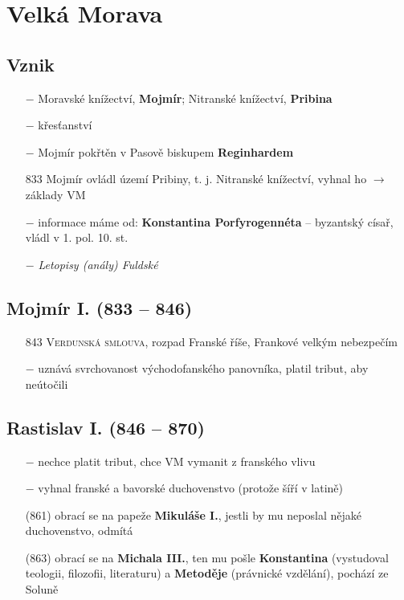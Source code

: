 \documentclass{article}
\begin{document}
\section*{Velká Morava}

\subsection*{Vznik}
\begin{itemize}
    \vspace{-0.5em}
    \setlength\itemsep{0.15em}
    \item[$-$] Moravské knížectví, \textbf{Mojmír}; Nitranské knížectví, \textbf{Pribina}
    \item[$-$] křesťanství
    \item[$-$] Mojmír pokřtěn v Pasově biskupem \textbf{Reginhardem}
    \item[833] Mojmír ovládl území Pribiny, t. j. Nitranské knížectví, vyhnal ho $\rightarrow$ základy VM
    \item[$-$] informace máme od: \textbf{Konstantina Porfyrogennéta} -- byzantský císař, vládl v 1. pol. 10. st.
    \item[$-$] \textit{Letopisy (anály) Fuldské}
\end{itemize}

\subsection*{Mojmír I. (833 -- 846)}
\begin{itemize}
    \vspace{-0.5em}
    \setlength\itemsep{0.15em}
    \item[843] \textsc{Verdunská smlouva}, rozpad Franské říše, Frankové velkým nebezpečím
    \item[$-$] uznává svrchovanost východofanského panovníka, platil tribut, aby neútočili
\end{itemize}

\subsection*{Rastislav I. (846 -- 870)}
\begin{itemize}
    \vspace{-0.5em}
    \setlength\itemsep{0.15em}
    \item[$-$] nechce platit tribut, chce VM vymanit z franského vlivu
    \item[$-$] vyhnal franské a bavorské duchovenstvo (protože šíří v latině)
    \item[(861)] obrací se na papeže \textbf{Mikuláše I.}, jestli by mu neposlal nějaké duchovenstvo, odmítá
    \item[(863)] obrací se na \textbf{Michala III.}, ten mu pošle \textbf{Konstantina} (vystudoval teologii, filozofii, literaturu) a \textbf{Metoděje} (právnické vzdělání), pochází ze Soluně
\end{itemize}
\end{document}
